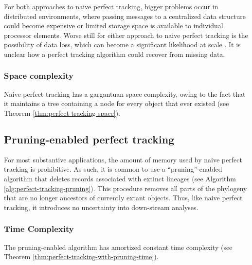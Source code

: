 For both approaches to naive perfect tracking, bigger problems occur in distributed environments, where passing messages to a centralized data structure could become expensive \citep{moreno2022hereditary} or limited storage space is available to individual processor elements.
Worse still for either approach to naive perfect tracking is the possibility of data loss, which can become a significant likelihood at scale \citep{cappello2014toward}.
It is unclear how a perfect tracking algorithm could recover from missing data.

\subsubsection{Space complexity}

Naive perfect tracking has a gargantuan space complexity, owing to the fact that it maintains a tree containing a node for every object that ever existed (see Theorem \ref{thm:perfect-tracking-space}).



\subsection{Pruning-enabled perfect tracking}
\label{sec:naive-perfect-tracking-with-pruning}

For most substantive applications, the amount of memory used by naive perfect tracking is prohibitive.
As such, it is common to use a ``pruning''-enabled algorithm that deletes records associated with extinct lineages (see Algorithm \ref{alg:perfect-tracking-pruning}). %
This procedure removes all parts of the phylogeny that are no longer ancestors of currently extant objects.
Thus, like naive perfect tracking, it introduces no uncertainty into down-stream analyses.





\subsubsection{Time Complexity}

The pruning-enabled algorithm has amortized constant time complexity (see Theorem \ref{thm:perfect-tracking-with-pruning-time}).



